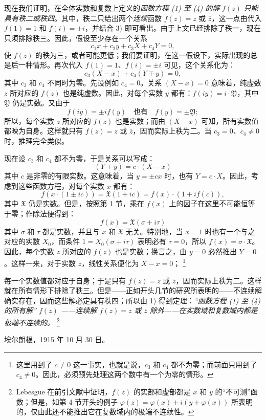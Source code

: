 \documentclass[11pt]{article}
\providecommand{\qtext}[1]{“#1”}
\providecommand{\Xreal}{\mathfrak X}
\providecommand{\Yreal}{\mathfrak Y}
\providecommand{\srcfn}[2]{%
  \begingroup\renewcommand{\thefootnote}{#1}\footnote{#2}\addtocounter{footnote}{-1}\endgroup}
\begin{document}
现在我们证明，在全体实数和复数上定义的\emph{函数方程 (1) 至 (4) 的解} \(f(z)\) \emph{只能具有秩二或秩四}。其中，秩二只给出两个\emph{连续}函数 \(f(z)=z\) 或 \(\overline z\)，这一点由代入 \(f(1)=1\) 和 \(f(i)=\pm i\)，并结合 3) 即可看出。由于上文已经排除了秩一，现在只须排除秩三。因此，假设至少存在一个关系
\[
c_1x+c_2y+c_3X+c_4Y=0,
\]
使 \(f(z)\) 的秩为三，或者可能更低；我们要证明，在这一假设下，实际出现的总是后一种情形。再次代入 \(f(1)=1\)、\(f(i)=\pm i\) 可见，这个关系化为：
\[
c_3(X-x)+c_4(Y\mp y)=0,
\]
其中 \(c_3\) 和 \(c_4\) 不同时为零。先设例如 \(c_4=0\)。关系 \((X-x)=0\) 意味着，纯虚数 \(z\) 所对应的 \(f(z)\) 也是纯虚数。因此，对每个实数 \(y\) 都有：\(f(iy)=i\cdot\Yreal\)，其中 \(\Yreal\) 仍是实数。又由于
\[
f(iy)=\pm i f(y)\quad\text{也有}\quad f(y)=\pm\Yreal;
\]
所以，每个实数 \(z\) 所对应的 \(f(z)\) 也是实数；而由 \((X-x)\) 可知，所有实数值都映为自身。这样就只有 \(f(z)=z\) 或 \(\overline z\)，因而实际上秩为二。当 \(c_3=0\)、\(c_4\ne0\) 时，推理完全类似。

现在设 \(c_3\) 和 \(c_4\) 都不为零，于是关系可以写成：
\[
(Y\mp y)=c\cdot(X-x)
\]
其中 \(c\) 是非零的有限实数。这意味着，当 \(y=\pm cx\) 时，也有 \(Y=c\cdot X\)。因此，考虑到这些函数方程，对每个实数 \(x\) 都有：
\[
f(x\cdot(1\pm ic))=\Xreal(1+ic)=f(x)\cdot(1+i f(c)),
\]
其中 \(\Xreal\) 仍是实数。但是，按照第 1 节，乘在 \(f(x)\) 上的因子在这里不可能恒等于零；作除法便得到：
\[
f(x)=\Xreal(\sigma+i\tau)
\]
其中 \(\sigma\) 和 \(\tau\) 都是实数，并且与 \(x\) 和 \(\Xreal\) 无关。特别地，当 \(x=1\) 时也有一个与之对应的实数 \(X_0\)，而条件 \(1=X_0(\sigma+i\tau)\) 表明必有 \(\tau=0\)，所以 \(f(x)=\sigma\cdot\Xreal\)。因此，每个实数 \(z\) 所对应的 \(f(z)\) 也是实数；换言之，由 \(y=0\) 必然推出 \(Y=0\)。这样一来，对于实数 \(z\)，线性关系便化为 \(X-x=0\)；\srcfn{*)}{这里用到了 \(c\ne0\) 这一事实，也就是说，\(c_3\) 和 \(c_4\) 都不为零；而前面只用到了 \(c_4\ne0\)。因此，必须预先处理这两个数中有一个为零的情形。}每一个实数值都对应于自身；于是只有 \(f(z)=z\) 或 \(\overline z\)，因而实际上秩为二。这样就在所有情形下排除了秩三。但是——正如开头几节的研究所表明的——不连续解确实存在，因而这些解必定具有秩四；所以由 1) 得到定理：\emph{\qtext{函数方程 (1) 至 (4) 的所有解} \(f(z)\) \emph{——连续解} \(f(z)=z\) \emph{或} \(\overline z\) \emph{除外——在实数域和复数域内都是极端不连续的。}}\srcfn{**)}{Lebesgue 在前引文献中证明，\(f(z)\) 的实部和虚部都是 \(x\) 和 \(y\) 的\qtext{不可测}函数；但是，如第 4 节开头的例子 \(\varphi(z)=\varphi(x)+i(y+\varphi(x))\) 所表明的，仅由此还不能推出它在复数域内的极端不连续性。}

\medskip
\noindent 埃尔朗根，1915 年 10 月 30 日。


\clearpage
\setcounter{footnote}{0}
\end{document}
